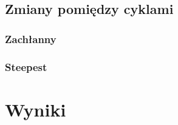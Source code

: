 \documentclass[11pt]{article}
\begin{document}
\subsection{Zmiany pomiędzy cyklami}\label{subsec:zmiany-pomiedzy-cyklami}

\subsubsection{Zachłanny}


\subsubsection{Steepest}


\section{Wyniki}\label{sec:wyniki}
\end{document}
